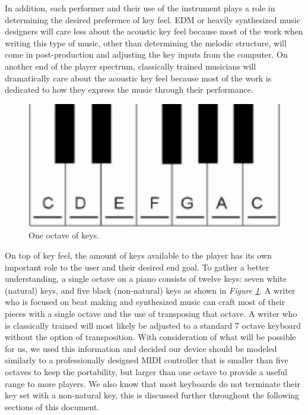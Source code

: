 In addition, each performer and their use of the instrument plays a role in determining the desired preference of key feel. EDM or heavily synthesized music designers will care less about the acoustic key feel because most of the work when writing this type of music, other than determining the melodic structure, will come in post-production and adjusting the key inputs from the computer. On another end of the player spectrum, classically trained musicians will dramatically care about the acoustic key feel because most of the work is dedicated to how they express the music through their performance.

\begin{figure}[h!]
  \centering
  \includegraphics[width=0.5\linewidth]{image/Octave.png}
  \caption{One octave of keys.}
  \label{fig:octave}
\end{figure}

On top of key feel, the amount of keys available to the player has its own important role to the user and their desired end goal. To gather a better understanding, a single octave on a piano consists of twelve keys: seven white (natural) keys, and five black (non-natural) keys as shown in \textit{Figure \ref{fig:octave}}. A writer who is focused on beat making and synthesized music can craft most of their pieces with a single octave and the use of transposing that octave. A writer who is classically trained will most likely be adjusted to a standard 7 octave keyboard without the option of transposition. With consideration of what will be possible for us, we used this information and decided our device should be modeled similarly to a professionally designed MIDI controller that is smaller than five octaves to keep the portability, but larger than one octave to provide a useful range to more players. We also know that most keyboards do not terminate their key set with a non-natural key, this is discussed further throughout the following sections of this document.

